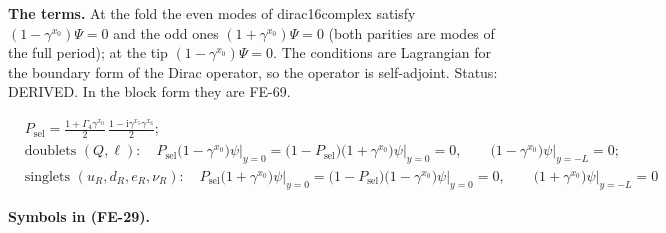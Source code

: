 \documentclass[
  10pt,
]{article}
\begin{document}
\textbf{The terms.} At the fold the even modes of dirac16complex satisfy
\((1 - \gamma^{x_0})\Psi = 0\) and the odd ones
\((1 + \gamma^{x_0})\Psi = 0\) (both parities are modes of the full
period); at the tip \((1 - \gamma^{x_0})\Psi = 0\). The conditions are
Lagrangian for the boundary form of the Dirac operator, so the operator
is self-adjoint. Status: DERIVED. In the block form they are FE-69.

\[
\begin{aligned}
&P_{\mathrm{sel}} = \frac{1 + \Gamma_4\gamma^{x_0}}{2}\,\frac{1 - \mathrm{i}\gamma^{x_5}\gamma^{x_6}}{2};\\
&\text{doublets } (Q, \ell):\quad P_{\mathrm{sel}}\big(1 - \gamma^{x_0}\big)\psi\big\vert_{y=0}
 = \big(1 - P_{\mathrm{sel}}\big)\big(1 + \gamma^{x_0}\big)\psi\big\vert_{y=0} = 0,\qquad
 \big(1 - \gamma^{x_0}\big)\psi\big\vert_{y=-L} = 0;\\
&\text{singlets } (u_R, d_R, e_R, \nu_R):\quad P_{\mathrm{sel}}\big(1 + \gamma^{x_0}\big)\psi\big\vert_{y=0}
 = \big(1 - P_{\mathrm{sel}}\big)\big(1 - \gamma^{x_0}\big)\psi\big\vert_{y=0} = 0,\qquad
 \big(1 + \gamma^{x_0}\big)\psi\big\vert_{y=-L} = 0
\end{aligned} \tag{FE-29}
\]

\textbf{Symbols in (FE-29).}
\end{document}

